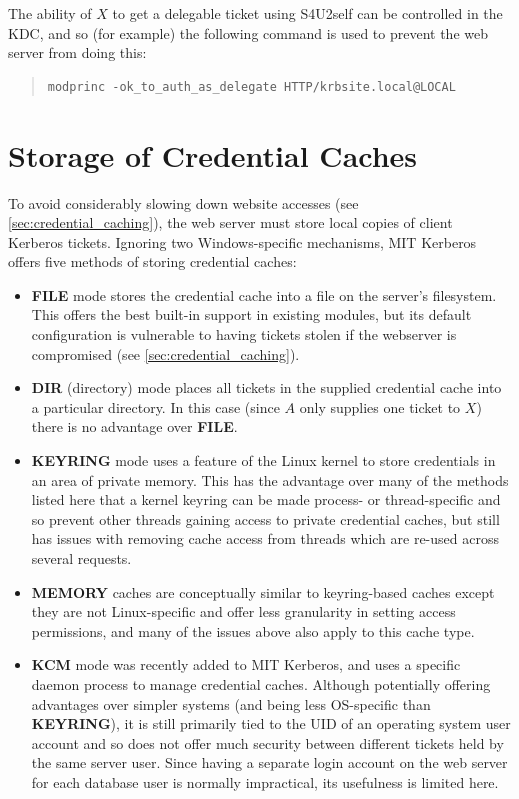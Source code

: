 \documentclass[12pt]{report}
\begin{document}
The ability of $X$ to get a delegable ticket using S4U2self can be controlled in the KDC, and so (for example) the following command is used to prevent the web server from doing this:

\begin{quote}
\begin{verbatim}
modprinc -ok_to_auth_as_delegate HTTP/krbsite.local@LOCAL
\end{verbatim}
\end{quote}

\section{Storage of Credential Caches}
\label{sec:storage_of_credential_caches}
To avoid considerably slowing down website accesses (see \autoref{sec:credential_caching}), the web server must store local copies of client Kerberos tickets. Ignoring two Windows-specific mechanisms, MIT Kerberos offers five methods of storing credential caches\cite{MIT-ccache-types}:

\begin{itemize}
\item
  \textbf{FILE} mode stores the credential cache into a file on the server's filesystem. This offers the best built-in support in existing modules, but its default configuration is vulnerable to having tickets stolen if the webserver is compromised (see \autoref{sec:credential_caching}).
\item
  \textbf{DIR} (directory) mode places all tickets in the supplied credential cache into a particular directory. In this case (since $A$ only supplies one ticket to $X$) there is no advantage over \textbf{FILE}.
\item
  \textbf{KEYRING} mode uses a feature of the Linux kernel to store credentials in an area of private memory. This has the advantage over many of the methods listed here that a kernel keyring can be made process- or thread-specific and so prevent other threads gaining access to private credential caches, but still has issues with removing cache access from threads which are re-used across several requests.
\item
  \textbf{MEMORY} caches are conceptually similar to keyring-based caches except they are not Linux-specific and offer less granularity in setting access permissions, and many of the issues above also apply to this cache type.
\item
  \textbf{KCM} mode was recently added to MIT Kerberos, and uses a specific daemon process to manage credential caches. Although potentially offering advantages over simpler systems (and being less OS-specific than \textbf{KEYRING}), it is still primarily tied to the UID of an operating system user account and so does not offer much security between different tickets held by the same server user. Since having a separate login account on the web server for each database user is normally impractical, its usefulness is limited here.
\end{itemize}
\end{document}
